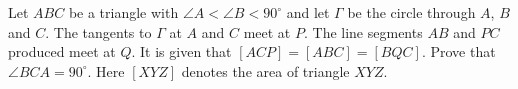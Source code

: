 Let $ABC$ be a triangle with $\angle A < \angle B < 90^\circ$ and let $\Gamma$ be the circle through $A$, $B$ and $C$. The tangents to $\Gamma$ at $A$ and $C$ meet at $P$. The line segments $AB$ and $PC$ produced meet at $Q$. It is given that $[ACP] = [ABC] = [BQC]$. Prove that $\angle BCA = 90^\circ$. Here $[XYZ]$ denotes the area of triangle $XYZ$.

